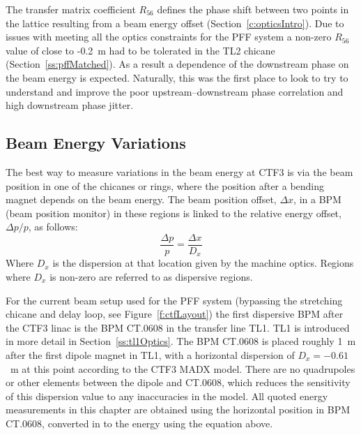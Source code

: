 The transfer matrix coefficient \(R_{56}\) defines the phase shift between two points in the lattice resulting from a beam energy offset (Section~\ref{c:opticsIntro}). Due to issues with meeting all the optics constraints for the PFF system a non-zero \(R_{56}\) value of close to -0.2~m had to be tolerated in the TL2 chicane (Section~\ref{ss:pffMatched}).  As a result a dependence of the downstream phase on the beam energy is expected. Naturally, this was the first place to look to try to understand and improve the poor upstream--downstream phase correlation and high downstream phase jitter.

\subsection{Beam Energy Variations}
\label{ss:energyVariations}

The best way to measure variations in the beam energy at CTF3 is via the beam position in one of the chicanes or rings, where the position after a bending magnet depends on the beam energy. The beam position offset, \(\Delta x\), in a BPM (beam position monitor) in these regions is linked to the relative energy offset, \(\Delta p / p\), as follows:
\begin{equation}
\frac{\Delta p}{p} = \frac{\Delta x}{D_x}
\end{equation}
Where \(D_{x}\) is the dispersion at that location given by the machine optics. Regions where \(D_{x}\) is non-zero are referred to as dispersive regions.

For the current beam setup used for the PFF system (bypassing the stretching chicane and delay loop, see Figure~\ref{f:ctfLayout}) the first dispersive BPM after the CTF3 linac is the BPM CT.0608 in the transfer line TL1.  TL1 is introduced in more detail in Section~\ref{ss:tl1Optics}. The BPM CT.0608 is placed roughly 1~m after the first dipole magnet in TL1, with a horizontal dispersion of \(D_{x} = -0.61\)~m at this point according to the CTF3 MADX model. There are no quadrupoles or other elements between the dipole and CT.0608, which reduces the sensitivity of this dispersion value to any inaccuracies in the model. All quoted energy measurements in this chapter are obtained using the horizontal position in BPM CT.0608, converted in to the energy using the equation above. %

